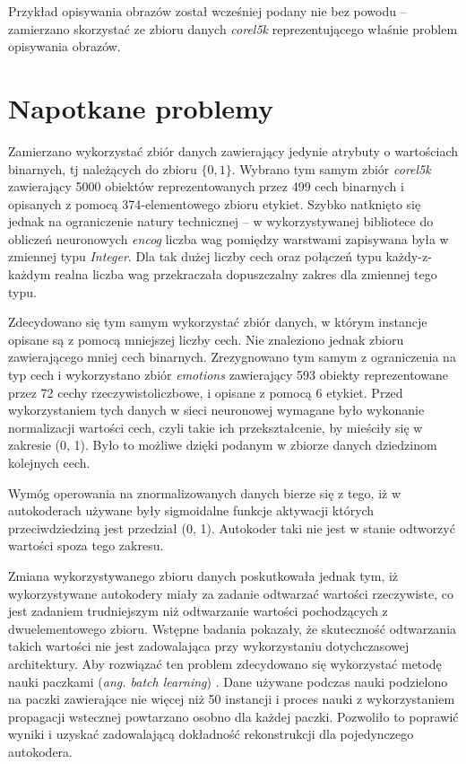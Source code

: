 \documentclass[11pt,a4paper,oneside]{report}
\begin{document}
Przykład opisywania obrazów został wcześniej podany nie bez powodu -- zamierzano skorzystać ze zbioru danych \textit{corel5k} \cite{alcala2010keel} reprezentującego właśnie problem opisywania obrazów.

\section{Napotkane problemy}

Zamierzano wykorzystać zbiór danych zawierający jedynie atrybuty o wartościach binarnych, tj należących do zbioru $\lbrace 0, 1 \rbrace$. Wybrano tym samym zbiór \textit{corel5k} zawierający 5000 obiektów reprezentowanych przez 499 cech binarnych i opisanych z pomocą 374-elementowego zbioru etykiet. Szybko natknięto się jednak na ograniczenie natury technicznej -- w wykorzystywanej bibliotece do obliczeń neuronowych \textit{encog} liczba wag pomiędzy warstwami zapisywana była w zmiennej typu \textit{Integer}. Dla tak dużej liczby cech oraz połączeń typu każdy-z-każdym realna liczba wag przekraczała dopuszczalny zakres dla zmiennej tego typu.

Zdecydowano się tym samym wykorzystać zbiór danych, w którym instancje opisane są z pomocą mniejszej liczby cech. Nie znaleziono jednak zbioru zawierającego mniej cech binarnych. Zrezygnowano tym samym z ograniczenia na typ cech i wykorzystano zbiór \textit{emotions} \cite{alcala2010keel} zawierający 593 obiekty reprezentowane przez 72 cechy rzeczywistoliczbowe, i opisane z pomocą 6 etykiet. Przed wykorzystaniem tych danych w sieci neuronowej wymagane było wykonanie normalizacji wartości cech, czyli takie ich przekształcenie, by mieściły się w zakresie (0, 1). Było to możliwe dzięki podanym w zbiorze danych dziedzinom kolejnych cech.

Wymóg operowania na znormalizowanych danych bierze się z tego, iż w autokoderach używane były sigmoidalne funkcje aktywacji których przeciwdziedziną jest przedział (0, 1). Autokoder taki nie jest w stanie odtworzyć wartości spoza tego zakresu.

Zmiana wykorzystywanego zbioru danych poskutkowała jednak tym, iż wykorzystywane autokodery miały za zadanie odtwarzać wartości rzeczywiste, co jest zadaniem trudniejszym niż odtwarzanie wartości pochodzących z dwuelementowego zbioru. Wstępne badania pokazały, że skuteczność odtwarzania takich wartości nie jest zadowalająca przy wykorzystaniu dotychczasowej architektury. Aby rozwiązać ten problem zdecydowano się wykorzystać metodę nauki paczkami (\textit{ang. batch learning}) \cite{ngiam2011optimization}. Dane używane podczas nauki podzielono na paczki zawierające nie więcej niż 50 instancji i proces nauki z wykorzystaniem propagacji wstecznej powtarzano osobno dla każdej paczki. Pozwoliło to poprawić wyniki i uzyskać zadowalającą dokładność rekonstrukcji dla pojedynczego autokodera.
\end{document}
